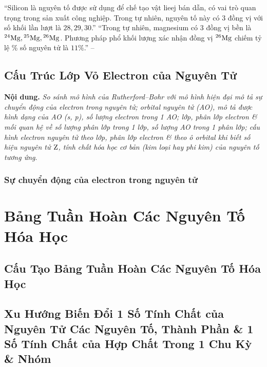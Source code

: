 \documentclass[oneside]{book}
\numberwithin{equation}{section}
\begin{document}
``Silicon là nguyên tố được sử dụng để chế tạo vật lieej bán dẫn, có vai trò quan trọng trong sản xuất công nghiệp. Trong tự nhiên, nguyên tố này có 3 đồng vị với số khối lần lượt là $28,29,30$.'' ``Trong tự nhiên, magnesium có 3 đồng vị bền là $\rm{}^{24}Mg,{}^{25}Mg,{}^{26}Mg$. Phương pháp phổ khối lượng xác nhận đồng vị $\rm{}^{26}Mg$ chiếm tỷ lệ \% số nguyên tử là $11\%$.'' -- \cite[p. 25]{SGK_Hoa_Hoc_10_Chan_Troi_Sang_Tao}


\section{Cấu Trúc Lớp Vỏ Electron của Nguyên Tử}
\textbf{Nội dung.} \textit{So sánh mô hình của Rutherford--Bohr với mô hình hiện đại mô tả sự chuyển động của electron trong nguyên tử; orbital nguyên tử (AO), mô tả được hình dạng của AO (s, p), số lượng electron trong 1 AO; lớp, phân lớp electron \& mối quan hệ về số lượng phân lớp trong 1 lớp, số lượng AO trong 1 phân lớp; cấu hình electron nguyên tử theo lớp, phân lớp electron \& theo ô orbital khi biết số hiệu nguyên tử $\rm Z$, tính chất hóa học cơ bản (kim loại hay phi kim) của nguyên tố tương ứng}.

\subsection{Sự chuyển động của electron trong nguyên tử}


\chapter{Bảng Tuần Hoàn Các Nguyên Tố Hóa Học}

\section{Cấu Tạo Bảng Tuần Hoàn Các Nguyên Tố Hóa Học}


\section{Xu Hướng Biến Đổi 1 Số Tính Chất của Nguyên Tử Các Nguyên Tố, Thành Phần \& 1 Số Tính Chất của Hợp Chất Trong 1 Chu Kỳ \& Nhóm}
\end{document}
